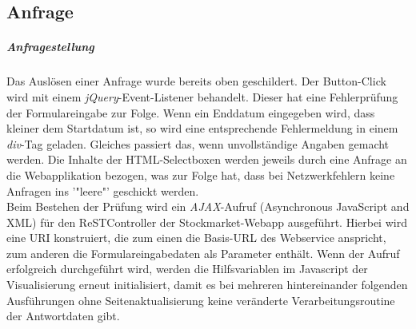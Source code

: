 \subsection{Anfrage}
\label{subsection:Anfrage}

\subparagraph{Anfragestellung}
Das Auslösen einer Anfrage wurde bereits oben geschildert. Der Button-Click wird mit einem \emph{jQuery}-Event-Listener behandelt. Dieser hat eine Fehlerprüfung der Formulareingabe zur Folge. Wenn ein Enddatum eingegeben wird, dass kleiner dem Startdatum ist, so wird eine entsprechende Fehlermeldung in einem \emph{div}-Tag geladen. Gleiches passiert das, wenn unvollständige Angaben gemacht werden. Die Inhalte der HTML-Selectboxen werden jeweils durch eine Anfrage an die Webapplikation bezogen, was zur Folge hat, dass bei Netzwerkfehlern keine Anfragen ins '"leere"' geschickt werden.\\ 
Beim Bestehen der Prüfung wird ein \emph{AJAX}-Aufruf (Asynchronous JavaScript and XML) für den ReSTController der Stockmarket-Webapp ausgeführt. Hierbei wird eine URI konstruiert, die zum einen die Basis-URL des Webservice anspricht, zum anderen die Formulareingabedaten als Parameter enthält. Wenn der Aufruf erfolgreich durchgeführt wird, werden die Hilfsvariablen im Javascript der Visualisierung erneut initialisiert, damit es bei mehreren hintereinander folgenden Ausführungen ohne Seitenaktualisierung keine veränderte Verarbeitungsroutine der Antwortdaten gibt.

